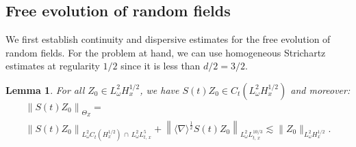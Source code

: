 \documentclass[10pt]{amsart}
\newtheorem{lemm}[theo]{Lemma}\newtheorem{prop}[theo]{Proposition}\newtheorem{coro}[theo]{Corollary}\newtheorem{conj}[theo]{Conjecture}
\theoremstyle{definition}\newtheorem{defi}[theo]{Definition}\newtheorem{rema}[theo]{Remark}\newtheorem{exam}[theo]{Example}\newtheorem{exem}[theo]{Example}\newtheorem{nota}[theo]{Notation}
\begin{document}
\subsection{Free evolution of random fields}

We first establish continuity and dispersive estimates for the free evolution of random fields. For the problem at hand, we can use homogeneous Strichartz estimates at regularity $1/2$ since it is less than $d/2=3/2$.

\begin{lemm}\label{lem:strichartzrandom}
For all $Z_0 \in L^2_\omega H^{1/2}_x$, we have $S(t)Z_0\in C_t(L^2_\omega H^{1/2}_x)$ and moreover:
\begin{multline} \label{bd:strichartzrandom}
\left\| S(t)Z_0\right\|_{\Theta_Z}=\\
\left\|S(t)Z_0\right\|_{L^2_\omega C_t\left(H^{1/2}_x\right)\,\cap \,L^2_\omega L^5_{t,\,x}}+\left\| \langle \nabla \rangle^{\frac 12}S(t)Z_0\right\|_{L^2_\omega L^{10/3}_{t,\,x}} \lesssim \|Z_0\|_{L^2_\omega H^{1/2}_x}.
\end{multline}
\end{lemm}
\end{document}
